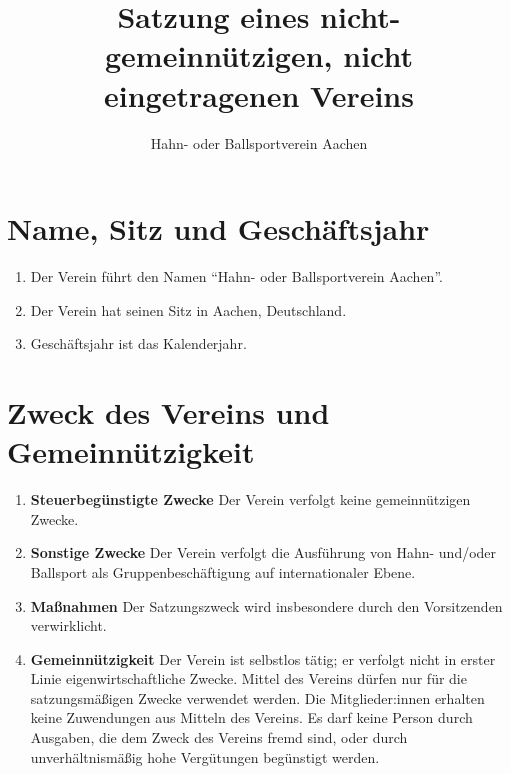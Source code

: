 \documentclass{scrartcl}
\title{Satzung eines nicht-gemeinnützigen, nicht eingetragenen Vereins}
\author{Hahn- oder Ballsportverein Aachen}
\begin{document}
    \maketitle
    \section{Name, Sitz und Geschäftsjahr}
        \begin{enumerate}
            \item Der Verein führt den Namen ``Hahn- oder Ballsportverein Aachen''.
            \item Der Verein hat seinen Sitz in Aachen, Deutschland.
            \item Geschäftsjahr ist das Kalenderjahr.
        \end{enumerate}
    \section{Zweck des Vereins und Gemeinnützigkeit}
        \begin{enumerate}
            \item \textbf{Steuerbegünstigte Zwecke} \newline
                Der Verein verfolgt keine gemeinnützigen Zwecke.
            \item \textbf{Sonstige Zwecke} \newline
                Der Verein verfolgt die Ausführung von Hahn- und/oder Ballsport als Gruppenbeschäftigung auf internationaler Ebene.
            \item \textbf{Maßnahmen} \newline
                Der Satzungszweck wird insbesondere durch den Vorsitzenden verwirklicht.
            \item \textbf{Gemeinnützigkeit} \newline
                Der Verein ist selbstlos tätig; er verfolgt nicht in erster Linie eigenwirtschaftliche Zwecke. Mittel
                des Vereins dürfen nur für die satzungsmäßigen Zwecke verwendet werden. Die
                Mitglieder:innen erhalten keine Zuwendungen aus Mitteln des Vereins. Es darf keine Person
                durch Ausgaben, die dem Zweck des Vereins fremd sind, oder durch unverhältnismäßig hohe
                Vergütungen begünstigt werden.
        \end{enumerate}
\end{document}
